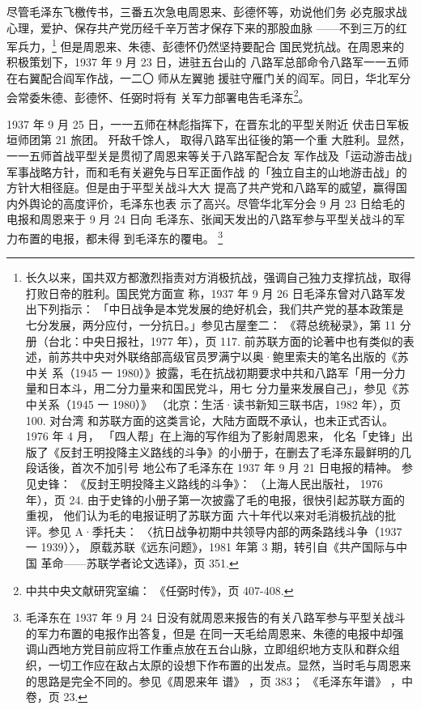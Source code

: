 尽管毛泽东飞檄传书，三番五次急电周恩来、彭德怀等，劝说他们务
必克服求战心理，爱护、保存共产党历经千辛万苦才保存下来的那股血脉
——不到三万的红军兵力，\footnote{长久以来，国共双方都激烈指责对方消极抗战，强调自己独力支撑抗战，取得打败日帝的胜利。国民党方面宣
称，1937 年 9 月 26 日毛泽东曾对八路军发出下列指示：
「中日战争是本党发展的绝好机会，我们共产党的基本政策是
七分发展，两分应付，一分抗日。」参见古屋奎二：
《蒋总统秘录》，第 11 分册（台北：中央日报社，1977 年），页 117. 
前苏联方面的论著中也有类似的表述，前苏共中央对外联络部高级官员罗满宁以奥·鲍里索夫的笔名出版的《苏中关
系（1945 一 1980）》披露，毛在抗战初期要求中共和八路军「用一分力量和日本斗，用二分力量来和国民党斗，用七
分力量来发展自己」，参见《苏中关系（1945 一 1980）》
（北京：生活·读书新知三联书店，1982 年），页 100. 对台湾
和苏联方面的这类言论，大陆方面既不承认，也未正式否认。1976 年 4 月，
「四人帮」在上海的写作组为了影射周恩来，
化名「史锋」出版了《反封王明投降主义路线的斗争》的小册于，在删去了毛泽东最鲜明的几段话後，首次不加引号
地公布了毛泽东在 1937 年 9 月 21 日电报的精神。
参见史锋：
《反封王明投降主义路线的斗争》：
（上海人民出版社， 1976 年），页 24. 
由于史锋的小册子第一次披露了毛的电报，很快引起苏联方面的重视，
他们认为毛的电报证明了苏联方面
六十年代以来对毛消极抗战的批评。参见 A·季托夫：
〈抗日战争初期中共领导内部的两条路线斗争（1937 一 1939）〉，
原载苏联《远东问题》，1981 年第 3 期，转引自《共产国际与中国
革命——苏联学者论文选译》，页 351.} 但是周恩来、朱德、彭德怀仍然坚持要配合
国民党抗战。在周恩来的积极策划下，1937 年 9 月 23 日，进驻五台山的
八路军总部命令八路军一一五师在右翼配合阎军作战，一二〇 师从左翼驰
援驻守雁门关的阎军。同日，华北军分会常委朱德、彭德怀、任弼时将有
关军力部署电告毛泽东\footnote{中共中央文献研究室编：
《任弼时传》，页 407-408.}。
 
1937 年 9 月 25 日，一一五师在林彪指挥下，在晋东北的平型关附近
伏击日军板垣师团第 21 旅团。
歼敌千馀人，
取得八路军出征後的第一个重
大胜利。显然，一一五师首战平型关是贯彻了周恩来等关于八路军配合友
军作战及「运动游击战」军事战略方针，而和毛有关避免与日军正面作战
的「独立自主的山地游击战」的方针大相径庭。但是由于平型关战斗大大
提高了共产党和八路军的威望，赢得国内外舆论的高度评价，毛泽东也表
示了高兴。尽管华北军分会 9 月 23 日给毛的电报和周恩来于 9 月 24 日向
毛泽东、张闻天发出的八路军参与平型关战斗的军力布置的电报，都未得
到毛泽东的覆电。
\footnote{毛泽东在 1937 年 9 月 24 日没有就周恩来报告的有关八路军参与平型关战斗的军力布置的电报作出答复，但是
在同一天毛给周恩来、朱德的电报中却强调山西地方党目前应将工作重点放在五台山脉，立即组织地方支队和群众组
织，一切工作应在敌占太原的设想下作布置的出发点。显然，当时毛与周恩来的思路是完全不同的。参见《周恩来年
谱》
，页 383；
《毛泽东年谱》
，中卷，页 23.}
 
